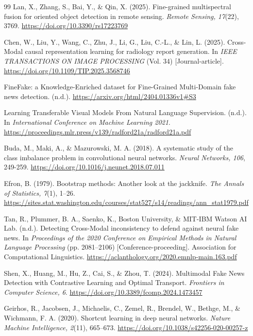 \begin{thebibliography}{99}
Lan, X., Zhang, S., Bai, Y., \& Qin, X. (2025). Fine-grained multispectral fusion for oriented object detection in remote sensing. \textit{Remote Sensing, 17}(22), 3769. \url{https://doi.org/10.3390/rs17223769}

Chen, W., Liu, Y., Wang, C., Zhu, J., Li, G., Liu, C.-L., \& Lin, L. (2025). Cross-Modal causal representation learning for radiology report generation. In \textit{IEEE TRANSACTIONS ON IMAGE PROCESSING} (Vol. 34) [Journal-article]. \url{https://doi.org/10.1109/TIP.2025.3568746}

FineFake: a Knowledge-Enriched dataset for Fine-Grained Multi-Domain fake news detection. (n.d.). \url{https://arxiv.org/html/2404.01336v1#S3}

Learning Transferable Visual Models From Natural Language Supervision. (n.d.). In \textit{International Conference on Machine Learning 2021}. \url{https://proceedings.mlr.press/v139/radford21a/radford21a.pdf}

Buda, M., Maki, A., \& Mazurowski, M. A. (2018). A systematic study of the class imbalance problem in convolutional neural networks. \textit{Neural Networks, 106}, 249-259. \url{https://doi.org/10.1016/j.neunet.2018.07.011}

Efron, B. (1979). Bootstrap methods: Another look at the jackknife. \textit{The Annals of Statistics, 7}(1), 1--26. \url{https://sites.stat.washington.edu/courses/stat527/s14/readings/ann_stat1979.pdf}

Tan, R., Plummer, B. A., Saenko, K., Boston University, \& MIT-IBM Watson AI Lab. (n.d.). Detecting Cross-Modal inconsistency to defend against neural fake news. In \textit{Proceedings of the 2020 Conference on Empirical Methods in Natural Language Processing} (pp. 2081--2106) [Conference-proceeding]. Association for Computational Linguistics. \url{https://aclanthology.org/2020.emnlp-main.163.pdf}

Shen, X., Huang, M., Hu, Z., Cai, S., \& Zhou, T. (2024). Multimodal Fake News Detection with Contrastive Learning and Optimal Transport. \textit{Frontiers in Computer Science, 6}. \url{https://doi.org/10.3389/fcomp.2024.1473457}

Geirhos, R., Jacobsen, J., Michaelis, C., Zemel, R., Brendel, W., Bethge, M., \& Wichmann, F. A. (2020). Shortcut learning in deep neural networks. \textit{Nature Machine Intelligence, 2}(11), 665--673. \url{https://doi.org/10.1038/s42256-020-00257-z}


\end{thebibliography}
